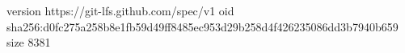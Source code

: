 version https://git-lfs.github.com/spec/v1
oid sha256:d0fc275a258b8e1fb59d49ff8485ec953d29b258d4f426235086dd3b7940b659
size 8381
